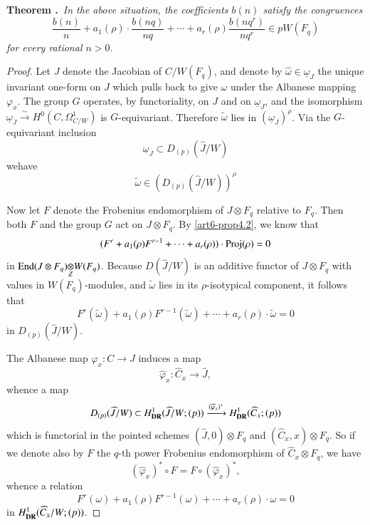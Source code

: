 \medskip
\noindent
{\bf Theorem .\label{art6-thm6.1}}~{\em In the above situation, the coefficients $b(n)$ satisfy the congruences}
$$
\frac{b(n)}{n}+a_{1}(\rho)\cdot \frac{b(nq)}{nq}+\cdots+a_{r}(\rho)\frac{b(nq^{r})}{nq^{r}}\in pW(F_{q})
$$
{\em for every rational $n>0$.}

\begin{proof}
Let $J$ denote the Jacobian of $C/W(F_{q})$, and denote by $\widehat{\omega}\in \underline{\omega}_{J}$ the unique invariant one-form on $J$ which pulls back to give $\omega$ under the Albanese mapping $\varphi_{x}$. The group $G$ operates, by functoriality, on $J$ and on $\underline{\omega}_{J}$, and the isomorphism $\underline{\omega}_{J}\xrightarrow{\sim}H^{0}(C,\Omega^{1}_{C/W})$ is $G$-equivariant. Therefore $\widetilde{\omega}$ lies in $(\underline{\omega}_{J})^{\rho}$. Via the $G$-equivariant inclusion
$$
\underline{\omega}_{J}\subset D_{(p)}(\widehat{J}/W)
$$
we\pageoriginale have
$$
\widetilde{\omega}\in (D_{(p)}(\widehat{J}/W))^{\rho}
$$

Now let $F$ denote the Frobenius endomorphism of $J\otimes F_{q}$ relative to $F_{q}$. Then both $F$ and the group $G$ act on $J\otimes F_{q}$. By \eqref{art6-prop4.2}, we know that
$$
(F^{r}+a_{1}(\rho)F^{r-1}+\cdots+a_{r}(\rho))\cdot \operatorname{Proj}(\rho)=0
$$
in $\foprod{\End(J\otimes F_{q})}{W(F_{q})}{Z}$. Because $D(\widehat{J}/W)$ is an additive functor of $J\otimes F_{q}$ with values in $W(F_{q})$-modules, and $\widetilde{\omega}$ lies in its $\rho$-isotypical component, it follows that
\begin{equation*}
F^{r}(\widetilde{\omega})+a_{1}(\rho)F^{r-1}(\widetilde{\omega})+\cdots+a_{r}(\rho)\cdot \widetilde{\omega}=0\tag{6.1.1}\label{art6-eq6.1.1}
\end{equation*}
in $D_{(p)}(\widehat{J}/W)$.

The Albanese map $\varphi_{x}:C\to J$ induces a map
$$
\widehat{\varphi}_{x}:\widehat{C}_{x}\to \widehat{J},
$$
whence a map
$$
D_{(p)}(\widehat{J}/W)\subset H^{1}_{\mathbf{DR}}(\widehat{J}/W;(p))\xrightarrow{(\widehat{\varphi}_{x})^{*}}H^{1}_{\mathbf{DR}}(\widehat{C}_{x};(p))
$$
which is functorial in the pointed schemes $(\widehat{J},0)\otimes F_{q}$ and $(\widehat{C}_{x},x)\otimes F_{q}$. So if we denote also by $F$ the $q$-th power Frobenius endomorphism of $\widehat{C}_{x}\otimes F_{q}$, we have
$$
(\widehat{\varphi}_{x})^{*}\circ F=F\circ (\widehat{\varphi}_{x})^{*},
$$
whence a relation
\begin{equation*}
F^{r}(\omega)+a_{1}(\rho)F^{r-1}(\omega)+\cdots+a_{r}(\rho)\cdot \omega=0\tag{6.1.2}\label{art6-eq6.1.2}
\end{equation*}
in $H^{1}_{\mathbf{DR}}(\widehat{C}_{x}/W;(p))$.


\end{proof}

